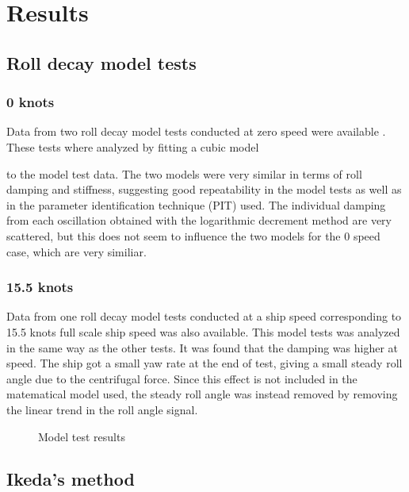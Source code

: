 \section{Results}\label{results}

    \subsection{Roll decay model tests}\label{roll-decay-model-tests}

\subsubsection{0 knots}\label{knots}

Data from two roll decay model tests conducted at zero speed were
available
.
These tests where analyzed by fitting a cubic model

to the model test data. The two models were very similar in terms of
roll damping and stiffness, suggesting good repeatability in the model
tests as well as in the parameter identification technique (PIT) used.
The individual damping from each oscillation obtained with the
logarithmic decrement method are very scattered, but this does not seem
to influence the two models for the 0 speed case, which are very
similiar.

    \subsubsection{15.5 knots}\label{knots}

Data from one roll decay model tests conducted at a ship speed
corresponding to 15.5 knots full scale ship speed was also available.
This model tests was analyzed in the same way as the other tests. It was
found that the damping was higher at speed. The ship got a small yaw
rate
 at the end of test, giving a small steady roll angle due to the
centrifugal force. Since this effect is not included in the matematical
model used, the steady roll angle was instead removed by removing the
linear trend in the roll angle signal.

    \begin{figure}
        \begin{center}\end{center}
        \caption{Model test results}
        \label{fig:mdl}
    \end{figure}
    
    \subsection{Ikeda's method}\label{ikedas-method}

